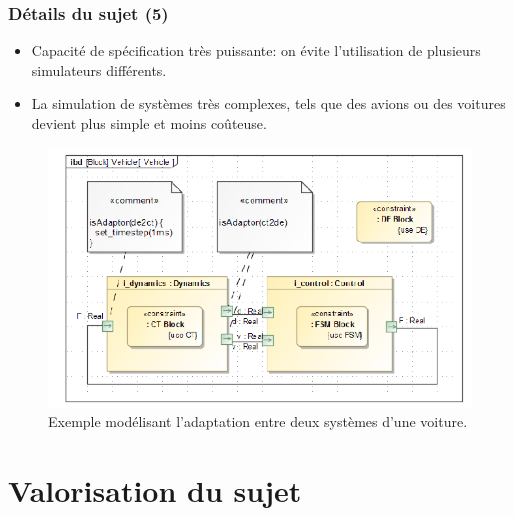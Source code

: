 \documentclass[10pt]{beamer}
\begin{document}
\begin{frame}
\frametitle{Détails du sujet (5)}

\begin{itemize}
\item Capacité de spécification très puissante: on évite l'utilisation de
plusieurs simulateurs différents.
\item La simulation de systèmes très complexes, tels que des avions ou des
voitures devient plus simple et moins coûteuse. \\ 
\end{itemize}

\begin{figure}[h]
\centering
\includegraphics[scale=0.25]{images/exemple1}
\caption{Exemple modélisant l'adaptation entre deux systèmes d'une
voiture.}
\label{fig:ex1}
\end{figure}

\end{frame}


\section{Valorisation du sujet}
\end{document}
